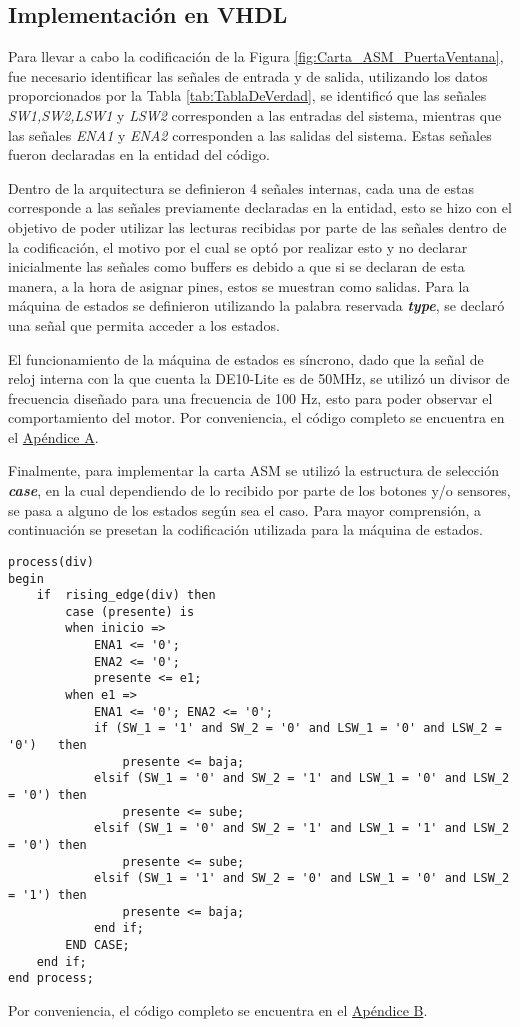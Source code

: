 \documentclass{article}
\begin{document}
\subsection{Implementación en VHDL}
Para llevar a cabo la codificación de la Figura \ref{fig:Carta_ASM_PuertaVentana}, fue necesario identificar las señales de entrada y de salida, utilizando los datos proporcionados por la Tabla \ref{tab:TablaDeVerdad}, se identificó que las señales \textit{SW1,SW2,LSW1} y \textit{LSW2} corresponden a las entradas del sistema, mientras que las señales \textit{ENA1} y \textit{ENA2} corresponden a las salidas del sistema. Estas señales fueron declaradas en la entidad del código. 

Dentro de la arquitectura se definieron 4 señales internas, cada una de estas corresponde a las señales previamente declaradas en la entidad, esto se hizo con el objetivo de poder utilizar las lecturas recibidas por parte de las señales dentro de la codificación, el motivo por el cual se optó por realizar esto y no declarar inicialmente las señales como buffers es debido a que si se declaran de esta manera, a la hora de asignar pines, estos se muestran como salidas. Para la máquina de estados se definieron utilizando la palabra reservada \textbf{\textit{type}}, se declaró una señal que permita acceder a los estados.

El funcionamiento de la máquina de estados es síncrono, dado que la señal de reloj interna con la que cuenta la DE10-Lite es de 50MHz, se utilizó un divisor de frecuencia diseñado para una frecuencia de 100 Hz, esto para poder observar el comportamiento del motor. Por conveniencia, el código completo se encuentra en el \hyperref[appendixA]{Apéndice A}.

Finalmente, para implementar la carta ASM se utilizó la estructura de selección \textbf{\textit{case}}, en la cual dependiendo de lo recibido por parte de los botones y/o sensores, se pasa a alguno de los estados según sea el caso. Para mayor comprensión, a continuación se presetan la codificación utilizada para la máquina de estados.
\begin{lstlisting}[caption={Máquina de estados},label={lst:state_machine}]
process(div)
begin
	if  rising_edge(div) then
		case (presente) is
		when inicio => 
			ENA1 <= '0';
			ENA2 <= '0';
			presente <= e1;
		when e1 =>
			ENA1 <= '0'; ENA2 <= '0';
			if (SW_1 = '1' and SW_2 = '0' and LSW_1 = '0' and LSW_2 = '0')   then
				presente <= baja;
			elsif (SW_1 = '0' and SW_2 = '1' and LSW_1 = '0' and LSW_2 = '0') then
				presente <= sube;
			elsif (SW_1 = '0' and SW_2 = '1' and LSW_1 = '1' and LSW_2 = '0') then
				presente <= sube;
			elsif (SW_1 = '1' and SW_2 = '0' and LSW_1 = '0' and LSW_2 = '1') then
				presente <= baja;
			end if;
		END CASE;
	end if;
end process;
\end{lstlisting}
Por conveniencia, el código completo se encuentra en el \hyperref[appendixB]{Apéndice B}.
\end{document}
